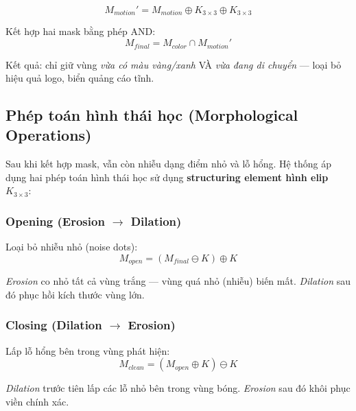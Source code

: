 \documentclass[12pt,a4paper]{article}
\begin{document}
\begin{equation}
M_{motion}' = M_{motion} \oplus K_{3\times3} \oplus K_{3\times3}
\end{equation}

Kết hợp hai mask bằng phép AND:
\begin{equation}
M_{final} = M_{color} \cap M_{motion}'
\end{equation}

Kết quả: chỉ giữ vùng \textit{vừa có màu vàng/xanh} VÀ \textit{vừa đang di chuyển} --- loại bỏ hiệu quả logo, biển quảng cáo tĩnh.

\subsection{Phép toán hình thái học (Morphological Operations)}
\label{sec:morphology}

Sau khi kết hợp mask, vẫn còn nhiễu dạng điểm nhỏ và lỗ hổng. Hệ thống áp dụng hai phép toán hình thái học sử dụng \textbf{structuring element hình elip} $K_{3\times3}$:

\subsubsection{Opening (Erosion $\to$ Dilation)}
Loại bỏ nhiễu nhỏ (noise dots):
\begin{equation}
M_{open} = (M_{final} \ominus K) \oplus K
\end{equation}

\textit{Erosion} co nhỏ tất cả vùng trắng --- vùng quá nhỏ (nhiễu) biến mất. \textit{Dilation} sau đó phục hồi kích thước vùng lớn.

\subsubsection{Closing (Dilation $\to$ Erosion)}
Lấp lỗ hổng bên trong vùng phát hiện:
\begin{equation}
M_{clean} = (M_{open} \oplus K) \ominus K
\end{equation}

\textit{Dilation} trước tiên lấp các lỗ nhỏ bên trong vùng bóng. \textit{Erosion} sau đó khôi phục viền chính xác.
\end{document}
